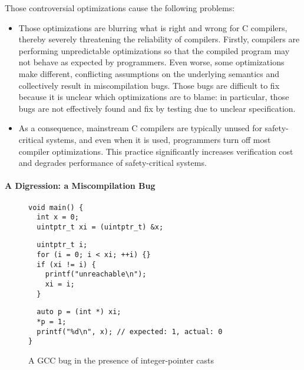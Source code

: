 Those controversial optimizations cause the following problems:
%
\begin{itemize}
\item Those optimizations are blurring what is right and wrong for C compilers, thereby severely
  threatening the reliability of compilers.  Firstly, compilers are performing unpredictable
  optimizations so that the compiled program may not behave as expected by programmers.  Even worse,
  some optimizations make different, conflicting assumptions on the underlying semantics and
  collectively result in miscompilation bugs.  Those bugs are difficult to fix because it is unclear
  which optimizations are to blame: in particular, those bugs are not effectively found and fix by
  testing due to unclear specification.

\item As a consequence, mainstream C compilers are typically unused for safety-critical systems, and
  even when it is used, programmers turn off most compiler optimizations.  This practice
  significantly increases verification cost and degrades performance of safety-critical systems.
\end{itemize}




\paragraph{A Digression: a Miscompilation Bug}

\begin{figure}[t]
\begin{center}
\small
\begin{minipage}{0.5\textwidth}
\begin{verbatim}
void main() { 
  int x = 0;
  uintptr_t xi = (uintptr_t) &x;
\end{verbatim}
\vskip -0.7cm
\begin{verbatim}
  uintptr_t i;
  for (i = 0; i < xi; ++i) {}
  if (xi != i) {
    printf("unreachable\n");
    xi = i;
  }
\end{verbatim}
\vskip -0.7cm
\begin{verbatim}
  auto p = (int *) xi;
  *p = 1;
  printf("%d\n", x); // expected: 1, actual: 0
}
\end{verbatim}
\end{minipage}
\end{center}
\caption{A GCC bug in the presence of integer-pointer casts}
\label{fig:introduction:bug}
\end{figure}

